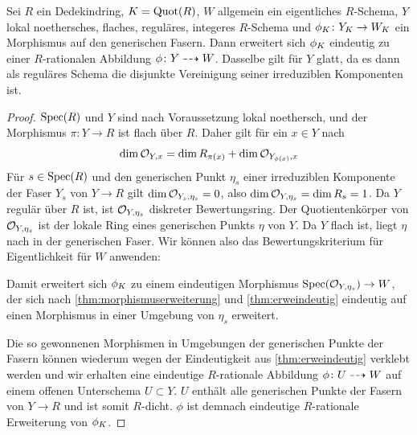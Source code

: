 \begin{Lemma}\label{thm:erwrrational}
  Sei $R$ ein Dedekindring, $K=\operatorname{Quot}(R)$, $W$ allgemein ein
  eigentliches $R$-Schema, $Y$ lokal noethersches, flaches, reguläres,
  integeres
  $R$-Schema und $\phi_{K}\colon Y_{K}\to W_{K}$ ein Morphismus auf den
  generischen Fasern.
  Dann erweitert sich $\phi_{K}$ eindeutig zu einer
  $R$-rationalen Abbildung $\phi\colon Y\dashrightarrow W$.
  Dasselbe gilt für $Y$ glatt, da es dann als reguläres Schema die
  disjunkte Vereinigung seiner irreduziblen Komponenten ist.
  \begin{proof}
    $\operatorname{Spec}(R)$ und $Y$ sind nach Voraussetzung lokal noethersch,
    und der Morphismus ${\pi\colon Y\to R}$ ist flach über $R$. Daher
    gilt für ein $x\in Y$ nach \cite[Theorem 4.3.12]{liu}
    \begin{gather}\label{eq:stalkdimension}
      \dim\mathcal{O}_{Y,x} = \dim R_{\pi(x)} + \dim\mathcal{O}_{Y_{\phi(x)}, x}
    \end{gather}
    Für $s\in\operatorname{Spec}(R)$ und den generischen Punkt $\eta_{s}$ einer
    irreduziblen Komponente der Faser $Y_s$ von $Y\to R$ gilt
    $\dim\mathcal{O}_{Y_s, \eta_{s}}=0$, also $\dim\mathcal{O}_{Y,\eta_{s}}=\dim R_s=1$.
    Da $Y$ regulär über $R$ ist, ist $\mathcal{O}_{Y,\eta_{s}}$ diskreter
    Bewertungsring.
    Der Quotientenkörper von $\mathcal{O}_{Y,\eta_{s}}$ ist der lokale Ring
    eines generischen Punkts $\eta$ von $Y$. Da $Y$ flach
    ist, liegt $\eta$ nach \cite[Proposition III.9.7]{hartshorne} in
    der generischen Faser.
    Wir können also das Bewertungskriterium für Eigentlichkeit für $W$
    anwenden:
    \begin{center}
    \end{center}
    Damit erweitert sich $\phi_{K}$ zu einem eindeutigen Morphismus
    $\operatorname{Spec}(\mathcal{O}_{Y,\eta_{s}})\to W$, der sich nach
    \ref{thm:morphismuserweiterung} und \ref{thm:erweindeutig}
    eindeutig auf einen Morphismus in einer Umgebung von $\eta_{s}$
    erweitert.
    
    Die so gewonnenen Morphismen in Umgebungen der generischen Punkte
    der Fasern können wiederum wegen der Eindeutigkeit aus
    \ref{thm:erweindeutig} verklebt werden
    und wir erhalten eine eindeutige $R$-rationale Abbildung
    $\phi\colon U\dashrightarrow W$ auf einem offenen Unterschema $U\subset Y$.
    $U$ enthält alle generischen Punkte der Fasern von $Y\to R$ und
    ist somit $R$-dicht.
    $\phi$ ist demnach eindeutige $R$-rationale Erweiterung von
    $\phi_{K}$.
  \end{proof}
\end{Lemma}
